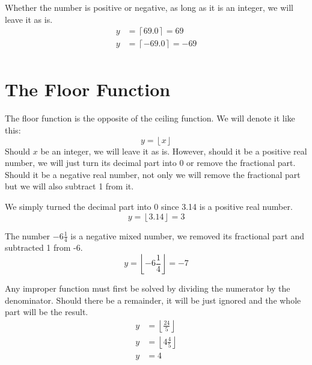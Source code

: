 \documentclass[letterpaper, twoside,12pt]{book}
\begin{document}
    Whether the number is positive or negative, as long as it is an integer, we will leave it as is.
    \begin{equation*}
        \begin{split}
            y &= \left\lceil 69.0 \right\rceil = 69\\
            y &= \left\lceil -69.0 \right\rceil = -69\\
        \end{split}
    \end{equation*}

    \section{The Floor Function}
    The floor function is the opposite of the ceiling function. We will denote it like this:
    \begin{equation}
        y = \left\lfloor x \right\rfloor
    \end{equation}
    Should $x$ be an integer, we will leave it as is. However, should it be a positive real number, we will just turn its decimal part into 0 or remove the fractional part. Should it be a negative real number, not only we will remove the fractional part but we will also subtract 1 from it.

    We simply turned the decimal part into 0 since 3.14 is a positive real number.
    \begin{equation*}
        y = \left\lfloor 3.14 \right\rfloor = 3
    \end{equation*}

    The number $-6\frac{1}{4}$ is a negative mixed number, we removed its fractional part and subtracted 1 from -6.
    \begin{equation*}
        y = \left\lfloor -6\frac{1}{4} \right\rfloor = -7
    \end{equation*}

    Any improper function must first be solved by dividing the numerator by the denominator. Should there be a remainder, it will be just ignored and the whole part will be the result.
    \begin{equation*}
        \begin{split}
            y &= \left\lfloor \frac{24}{5} \right\rfloor \\
            y &= \left\lfloor 4\frac{4}{5} \right\rfloor \\
            y &= 4
        \end{split}
    \end{equation*}
\end{document}
